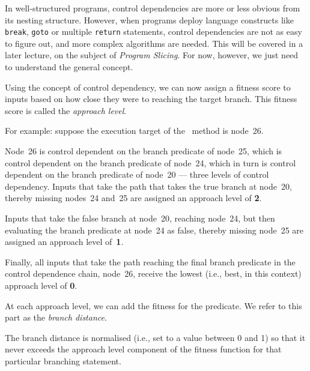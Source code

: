 In well-structured programs, control dependencies are more or less obvious from
its nesting structure. However, when programs deploy language constructs like
{\tt break}, {\tt goto} or multiple {\tt return} statements, control
dependencies are not as easy to figure out, and more complex algorithms are
needed. This will be covered in a later lecture, on the subject of {\it Program
Slicing}. For now, however, we just need to understand the general concept. 

Using the concept of control dependency, we can now assign a fitness score to
inputs based on how close they were to reaching the target branch. This fitness
score is called the {\it approach level}. 


For example: suppose the execution target of the \classifymethod~method is
node~26. 


Node~26 is control dependent on the branch predicate of node~25, which is
control dependent on the branch predicate of node~24, which in turn is control
dependent on the branch predicate of node~20 --- three levels of control
dependency. Inputs that take the path that takes the true branch at node~20,
thereby missing nodes~24 and~25 are assigned an approach level of {\bf 2}. 


Inputs that take the false branch at node~20, reaching node~24, but then
evaluating the branch predicate at node~24 as false, thereby missing node~25 are
assigned an approach level of~{\bf 1}. 


Finally, all inputs that take the path reaching the final branch predicate in
the control dependence chain, node~26, receive the lowest (i.e., best, in this
context) approach level of {\bf 0}.



At each approach level, we can add the fitness for the predicate. We refer to
this part as the {\it branch distance}. 


The branch distance is normalised (i.e., set to a value between 0 and 1) so that
it never exceeds the approach level component of the fitness function for that
particular branching statement.

